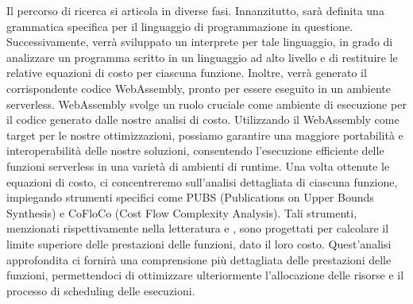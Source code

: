 \documentclass[../../main.tex]{subfiles}
\begin{document}
Il percorso di ricerca si articola in diverse fasi. Innanzitutto, sarà definita una grammatica specifica per il linguaggio di programmazione in questione. Successivamente, verrà sviluppato un interprete per tale linguaggio, in grado di analizzare un programma scritto in un linguaggio ad alto livello e di restituire le relative equazioni di costo per ciascuna funzione. Inoltre, verrà generato il corrispondente codice WebAssembly, pronto per essere eseguito in un ambiente serverless.
WebAssembly svolge un ruolo cruciale come ambiente di esecuzione per il codice generato dalle nostre analisi di costo. Utilizzando il WebAssembly come target per le nostre ottimizzazioni, possiamo garantire una maggiore portabilità e interoperabilità delle nostre soluzioni, consentendo l'esecuzione efficiente delle funzioni serverless in una varietà di ambienti di runtime.
Una volta ottenute le equazioni di costo, ci concentreremo sull'analisi dettagliata di ciascuna funzione, impiegando strumenti specifici come PUBS (Publications on Upper Bounds Synthesis) e CoFloCo (Cost Flow Complexity Analysis). Tali strumenti, menzionati rispettivamente nella letteratura \autocite{albert2008automatic} e \autocite{flores2014resource}, sono progettati per calcolare il limite superiore delle prestazioni delle funzioni, dato il loro costo. Quest'analisi approfondita ci fornirà una comprensione più dettagliata delle prestazioni delle funzioni, permettendoci di ottimizzare ulteriormente l'allocazione delle risorse e il processo di scheduling delle esecuzioni.
\end{document}
